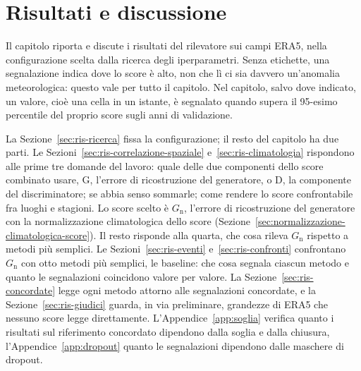 \chapter{Risultati e discussione}
\label{chap:risultati}


Il capitolo riporta e discute i risultati del rilevatore sui campi ERA5, nella configurazione scelta dalla ricerca degli iperparametri. Senza etichette, una segnalazione indica dove lo score è alto, non che lì ci sia davvero un'anomalia meteorologica: questo vale per tutto il capitolo. Nel capitolo, salvo dove indicato, un valore, cioè una cella in un istante, è segnalato quando supera il 95-esimo percentile del proprio score sugli anni di validazione.

La Sezione~\ref{sec:ris-ricerca} fissa la configurazione; il resto del capitolo ha due parti. Le Sezioni~\ref{sec:ris-correlazione-spaziale} e~\ref{sec:ris-climatologia} rispondono alle prime tre domande del lavoro: quale delle due componenti dello score combinato usare, G, l'errore di ricostruzione del generatore, o D, la componente del discriminatore; se abbia senso sommarle; come rendere lo score confrontabile fra luoghi e stagioni. Lo score scelto è $G_{\mathrm{n}}$, l'errore di ricostruzione del generatore con la normalizzazione climatologica dello score (Sezione~\ref{sec:normalizzazione-climatologica-score}). Il resto risponde alla quarta, che cosa rileva $G_{\mathrm{n}}$ rispetto a metodi più semplici. Le Sezioni~\ref{sec:ris-eventi} e~\ref{sec:ris-confronti} confrontano $G_{\mathrm{n}}$ con otto metodi più semplici, le baseline: che cosa segnala ciascun metodo e quanto le segnalazioni coincidono valore per valore. La Sezione~\ref{sec:ris-concordate} legge ogni metodo attorno alle segnalazioni concordate, e la Sezione~\ref{sec:ris-giudici} guarda, in via preliminare, grandezze di ERA5 che nessuno score legge direttamente. L'Appendice~\ref{app:soglia} verifica quanto i risultati sul riferimento concordato dipendono dalla soglia e dalla chiusura, l'Appendice~\ref{app:dropout} quanto le segnalazioni dipendono dalle maschere di dropout.

